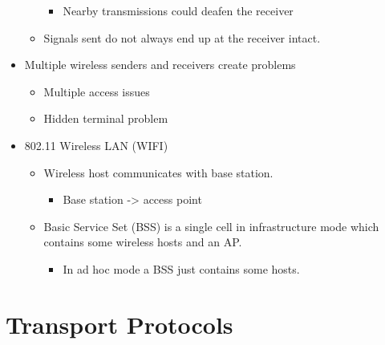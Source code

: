 \documentclass[]{article}
\providecommand{\tightlist}{%
  \setlength{\itemsep}{0pt}\setlength{\parskip}{0pt}}
\begin{document}
\begin{itemize}
\begin{itemize}
    \begin{itemize}
    \tightlist
    \item
      Nearby transmissions could deafen the receiver
    \end{itemize}
  \item
    Signals sent do not always end up at the receiver intact.
  \end{itemize}
\item
  Multiple wireless senders and receivers create problems

  \begin{itemize}
  \tightlist
  \item
    Multiple access issues
  \item
    Hidden terminal problem
  \end{itemize}
\item
  802.11 Wireless LAN (WIFI)

  \begin{itemize}
  \tightlist
  \item
    Wireless host communicates with base station.

    \begin{itemize}
    \tightlist
    \item
      Base station -\textgreater{} access point
    \end{itemize}
  \item
    Basic Service Set (BSS) is a single cell in infrastructure mode
    which contains some wireless hosts and an AP.

    \begin{itemize}
    \tightlist
    \item
      In ad hoc mode a BSS just contains some hosts.
    \end{itemize}
  \end{itemize}
\end{itemize}

\hypertarget{transport-protocols}{%
\section{Transport Protocols}\label{transport-protocols}}
\end{document}
